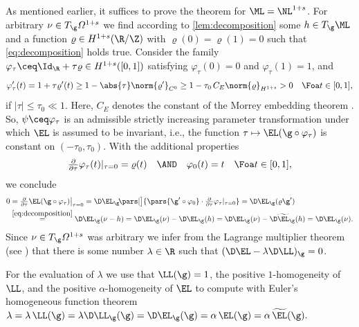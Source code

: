 \begin{refproof}
As mentioned earlier, it suffices to prove the theorem for $ \ML=\NL^{1+s} $. For arbitrary $\nu\in T_\g\varOmega^{1+s}$ we find 
according to \cref{lem:decomposition}
some $h\in T_\g\ML$ and a function $\varrho\in H^{1+s}(\R/\Z)$ with $\varrho(0)=\varrho(1)=0$ such that
\cref{eq:decomposition} holds true. Consider the family $\varphi_\tau\ceq
\Id_\R + \tau\varrho\in H^{1+s}([0,1])$ satisfying $\varphi_\tau(0)=0$ and
$\varphi_\tau(1)=1$, and 
$$
\varphi_\tau'(t)=1+\tau\varrho'(t)\ge 1 - \abs{\tau} \norm{\varrho'}_{C^0}\ge
1-\tau_0 \,C_E \norm{\varrho}_{H^{1+s}}>0\quad\Foa t\in [0,1],
$$
if $|\tau|\le\tau_0\ll 1$. Here, $C_E$ denotes the constant of the Morrey embedding
theorem \cite[Theorem A.2]{knappmann-etal_2023}. So, $\psi\ceq\varphi_\tau$ is an
admissible strictly increasing parameter transformation under which $\EL$ is assumed to be invariant, i.e.,
the function $\tau\mapsto \EL(\g\circ\varphi_\tau)$ is constant on $(-\tau_0,\tau_0)$.
With 
the additional properties 
$$
	\textstyle
	\frac{\partial}{\partial \tau}\varphi_\tau(t) |_{\tau=0}
	=
	\varrho(t)
	\quad\AND\quad
	\varphi_0(t) = t \quad\Foa t\in [0,1],
$$
we conclude
\begin{align*}
	0 &
	\textstyle
	= 
	\frac{\partial}{\partial \tau}\EL(\g\circ\varphi_\tau) \big|_{\tau=0}
	= 
	\D\EL_\g \!\pars[\big]{ \pars{\g'\circ\varphi_0} \cdot\frac{\partial}{\partial \tau}\varphi_\tau |_{\tau=0} }
	=
	\D\EL_\g(\varrho\g')
	\\
	&\overset{\cref{eq:decomposition}}{=}
	\D\EL_\g(\nu-h)
	=
	\D\EL_\g(\nu)-\D\EL_\g(h)
	=
	\D\EL_\g(\nu)-\D\widetilde{\EL}_\g(h)
	=
	\D\EL_\g(\nu)
	.
\end{align*}
Since $\nu\in T_\g\varOmega^{1+s}$ 
was arbitrary we infer from the Lagrange multiplier 
theorem (see \cite[Corollary 3.5.29]{abraham-etal_1988}) 
that there is some number $\lambda\in\R$ such that
$(\D\EL-\lambda \D\LL)_\g=0$.

For the evaluation of $\lambda$ we use that $\LL(\g)=1$,
the positive
$1$-homogeneity of $\LL$, and the positive $\alpha$-homogeneity of $\EL$ to
compute with Euler's homogeneous function theorem
$
\lambda = \lambda \, \LL(\g) = \lambda \D\LL_\g(\g) = \D\EL_\g(\g) = \alpha \, \EL(\g) =
 \alpha \, \widetilde{\EL}(\g).
$
\end{refproof}

